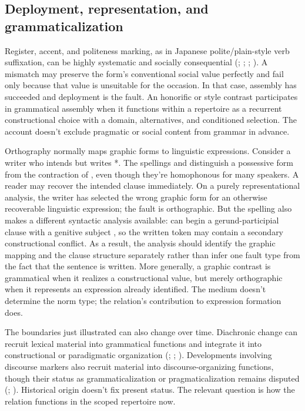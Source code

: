 \documentclass[12pt,letterpaper]{article}
\begin{document}
\subsection{Deployment, representation, and grammaticalization}
\label{sec:deployment-cases}

Register, accent, and politeness marking, as in Japanese polite/plain-style verb
suffixation, can be highly systematic and socially consequential
(\citealp[80--82, 301--340]{agha2007};
\citealp[87--88, 94--99]{eckert2012};
\citealp[45--64]{cook2008speechstyle};
\citealp[50--53]{ide2005}).
A mismatch may preserve the form's conventional social value
perfectly and fail only because that value is unsuitable for the occasion. In that
case, assembly has succeeded and deployment is the fault. An honorific or style
contrast participates in grammatical assembly when it functions within a
repertoire as a recurrent constructional choice with a domain, alternatives, and
conditioned selection. The account doesn't exclude pragmatic or social content from grammar
in advance.

Orthography normally maps graphic forms to linguistic expressions. Consider a
writer who intends  but writes
*. The spellings  and
 distinguish a possessive form from the contraction of
, even though they're homophonous for many speakers. A reader
may recover the intended clause immediately. On a purely representational
analysis, the writer has selected the wrong graphic form for an otherwise
recoverable linguistic expression; the fault is orthographic. But the spelling
also makes a different syntactic analysis available: 
can begin a gerund-participial clause with a genitive subject
\citep[1189--1193]{huddleston2002}, so the written token may contain a secondary
constructional conflict. As a result, the analysis should identify the
graphic mapping and the clause structure separately rather than infer one fault
type from the fact that the sentence is written. More generally, a graphic
contrast is grammatical when it realizes a constructional value, but merely
orthographic when it represents an expression already identified. The medium
doesn't determine the norm type; the relation's contribution to expression
formation does.

The boundaries just illustrated can also change over time. Diachronic change can
recruit lexical material into grammatical functions and integrate it into
constructional or paradigmatic organization
(\citealp[1--3, 71--98, 159--165]{hoppertraugott2003};
\citealp[129--152]{lehmann2015grammaticalization};
\citealp[77--84, 104--106]{jakobsenheltoft2012paradigm}). Developments involving discourse markers
also recruit material into discourse-organizing functions, though their status as
grammaticalization or pragmaticalization remains disputed
(\citealp[413--423]{waltereit2011discourse};
\citealp[59--65, 80--84]{degandeversvermeul2015}).
Historical origin doesn't fix present status. The relevant question is how the
relation functions in the scoped repertoire now.
\end{document}
